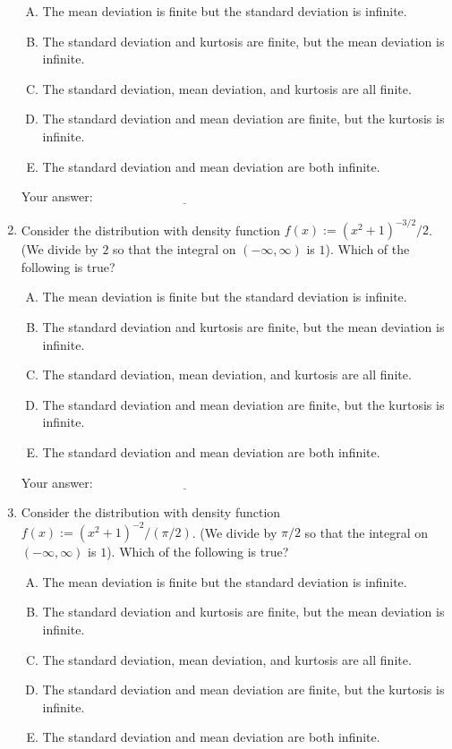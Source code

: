 \documentclass[10pt]{amsart}
\begin{document}
\begin{enumerate}
  \begin{enumerate}[(A)]
  \item The mean deviation is finite but the standard deviation is infinite.
  \item The standard deviation and kurtosis are finite, but the mean deviation is infinite.
  \item The standard deviation, mean deviation, and kurtosis are all finite.
  \item The standard deviation and mean deviation are finite, but the kurtosis is infinite.
  \item The standard deviation and mean deviation are both infinite.
  \end{enumerate}

  \vspace{0.1in}
  Your answer: $\underline{\qquad\qquad\qquad\qquad\qquad\qquad\qquad}$
  \vspace{0.15in}

\item Consider the distribution with density function $f(x):=
  (x^2+1)^{-3/2}/2$. (We divide by $2$ so that the integral on
  $(-\infty,\infty)$ is $1$). Which of the following is true?

  \begin{enumerate}[(A)]
  \item The mean deviation is finite but the standard deviation is infinite.
  \item The standard deviation and kurtosis are finite, but the mean deviation is infinite.
  \item The standard deviation, mean deviation, and kurtosis are all finite.
  \item The standard deviation and mean deviation are finite, but the kurtosis is infinite.
  \item The standard deviation and mean deviation are both infinite.
  \end{enumerate}

  \vspace{0.1in}
  Your answer: $\underline{\qquad\qquad\qquad\qquad\qquad\qquad\qquad}$
  \vspace{0.15in}

\item Consider the distribution with density function $f(x):=
  (x^2+1)^{-2}/(\pi/2)$. (We divide by $\pi/2$ so that the integral on
  $(-\infty,\infty)$ is $1$). Which of the following is true?

  \begin{enumerate}[(A)]
  \item The mean deviation is finite but the standard deviation is infinite.
  \item The standard deviation and kurtosis are finite, but the mean deviation is infinite.
  \item The standard deviation, mean deviation, and kurtosis are all finite.
  \item The standard deviation and mean deviation are finite, but the kurtosis is infinite.
  \item The standard deviation and mean deviation are both infinite.
  \end{enumerate}


\end{enumerate}
\end{document}
